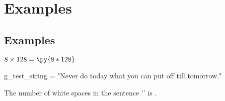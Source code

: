 \part{Examples}
    \chapter{Examples}
        \newcommand{\pymultiply}[2]{\py{#1*#2}}
        

        $8 \times 128 = \pymultiply{8}{128}$

        \begin{pycode}
g_test_string = "Never do today what you can put off till tomorrow."
        \end{pycode}
        The number of white spaces in the sentence '' is .
